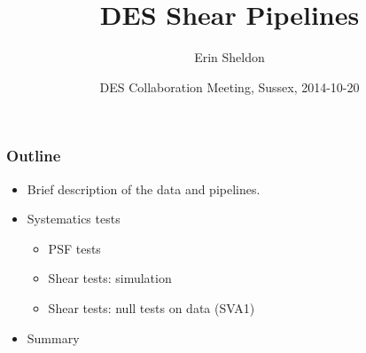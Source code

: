 \documentclass{beamer}
\begin{document}


\title{DES Shear Pipelines}
\author{Erin Sheldon}
\date{DES Collaboration Meeting, Sussex, 2014-10-20 }

\frame{\titlepage}

\frame
{
    \frametitle{Outline}

    \begin{itemize}

        \item Brief description of the data and pipelines.
        \item Systematics tests
            \begin{itemize}
                \item PSF tests
                \item Shear tests: simulation
                \item Shear tests: null tests on data (SVA1)
            \end{itemize}
        \item Summary
    \end{itemize}
}
 
\end{document}
